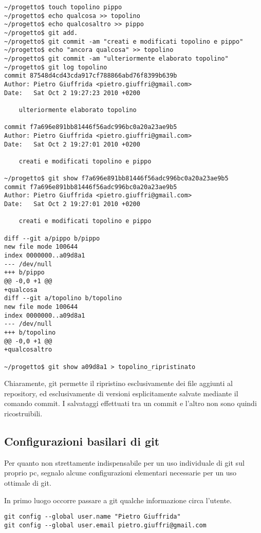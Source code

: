 \documentclass[a4paper,12pt,oneside]{article}
\begin{document}
\begin{lstlisting}
~/progetto$ touch topolino pippo
~/progetto$ echo qualcosa >> topolino
~/progetto$ echo qualcosaltro >> pippo
~/progetto$ git add.
~/progetto$ git commit -am "creati e modificati topolino e pippo"
~/progetto$ echo "ancora qualcosa" >> topolino
~/progetto$ git commit -am "ulteriormente elaborato topolino"
~/progetto$ git log topolino
commit 87548d4cd43cda917cf788866abd76f8399b639b
Author: Pietro Giuffrida <pietro.giuffri@gmail.com>
Date:   Sat Oct 2 19:27:23 2010 +0200

    ulteriormente elaborato topolino

commit f7a696e891bb81446f56adc996bc0a20a23ae9b5
Author: Pietro Giuffrida <pietro.giuffri@gmail.com>
Date:   Sat Oct 2 19:27:01 2010 +0200

    creati e modificati topolino e pippo

~/progetto$ git show f7a696e891bb81446f56adc996bc0a20a23ae9b5
commit f7a696e891bb81446f56adc996bc0a20a23ae9b5
Author: Pietro Giuffrida <pietro.giuffri@gmail.com>
Date:   Sat Oct 2 19:27:01 2010 +0200

    creati e modificati topolino e pippo

diff --git a/pippo b/pippo
new file mode 100644
index 0000000..a09d8a1
--- /dev/null
+++ b/pippo
@@ -0,0 +1 @@
+qualcosa
diff --git a/topolino b/topolino
new file mode 100644
index 0000000..a09d8a1
--- /dev/null
+++ b/topolino
@@ -0,0 +1 @@
+qualcosaltro

~/progetto$ git show a09d8a1 > topolino_ripristinato
\end{lstlisting}

Chiaramente, git permette il ripristino esclusivamente dei file aggiunti al
repository, ed esclusivamente di versioni esplicitamente salvate mediante il
comando commit. I salvataggi effettuati tra un commit e l'altro non sono quindi
ricostruibili.

\subsection{Configurazioni basilari di git}
Per quanto non strettamente indispensabile per un uso individuale di git sul
proprio pc, segnalo alcune configurazioni elementari necessarie per un uso
ottimale di git.

In primo luogo occorre passare a git qualche informazione circa l'utente.
\begin{lstlisting}
git config --global user.name "Pietro Giuffrida"
git config --global user.email pietro.giuffri@gmail.com
\end{lstlisting}
\end{document}
